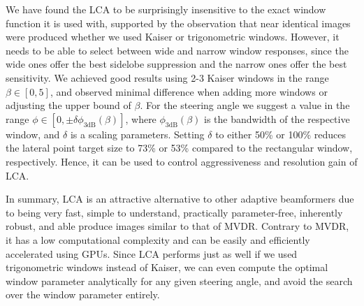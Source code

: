 \documentclass[10pt,journal,draftclsnofoot,onecolumn]{IEEEtran}
\newcommand\1{\vec 1}
\begin{document}
We have found the LCA to be surprisingly insensitive to the exact window function it is used with, supported by the observation that near identical images were produced whether we used Kaiser or trigonometric windows. However, it needs to be able to select between wide and narrow window responses, since the wide ones offer the best sidelobe suppression and the narrow ones offer the best sensitivity. We achieved good results using 2-3 Kaiser windows in the range $\beta\in[0,5]$, and observed minimal difference when adding more windows or adjusting the upper bound of $\beta$. For the steering angle we suggest a value in the range $\phi\in[0,\pm\delta\phi_\text{3dB}(\beta)]$, where $\phi_\text{3dB}(\beta)$ is the bandwidth of the respective window, and $\delta$ is a scaling parameters. Setting $\delta$ to either 50\% or 100\% reduces the lateral point target size to 73\% or 53\% compared to the rectangular window, respectively. Hence, it can be used to control aggressiveness and resolution gain of LCA.

In summary, LCA is an attractive alternative to other adaptive beamformers due to being very fast, simple to understand, practically parameter-free, inherently robust, and able produce images similar to that of MVDR. Contrary to MVDR, it has a low computational complexity and can be easily and efficiently accelerated using GPUs. Since LCA performs just as well if we used trigonometric windows instead of Kaiser, we can even compute the optimal window parameter analytically for any given steering angle, and avoid the search over the window parameter entirely.




% 

% 
% 
\end{document}
